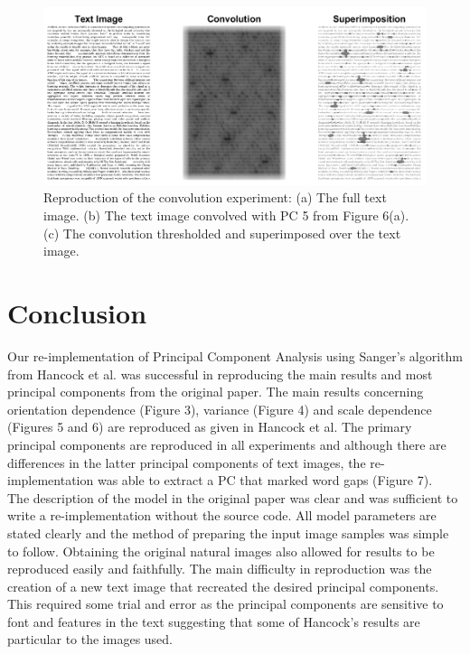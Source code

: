\begin{figure}
    \centering
    \includegraphics[scale=0.55]{figures/Figure7.png}
    \caption{Reproduction of the convolution experiment: (a) The full text image. (b) The text image convolved with PC 5 from Figure 6(a). (c) The convolution thresholded and superimposed over the text image.}
    \label{fig:Figure7}
\end{figure}

\section{Conclusion}
Our re-implementation of Principal Component Analysis using Sanger's algorithm from Hancock et al. was successful in reproducing the main results and most principal components from the original paper. The main results concerning orientation dependence (Figure 3), variance (Figure 4) and scale dependence (Figures 5 and 6) are reproduced as given in Hancock et al. The primary principal components are reproduced in all experiments and although there are differences in the latter principal components of text images, the re-implementation was able to extract a PC that marked word gaps (Figure 7).\\
The description of the model in the original paper was clear and was sufficient to write a re-implementation without the source code. All model parameters are stated clearly and the method of preparing the input image samples was simple to follow. Obtaining the original natural images also allowed for results to be reproduced easily and faithfully. The main difficulty in reproduction was the creation of a new text image that recreated the desired principal components. This required some trial and error as the principal components are sensitive to font and features in the text suggesting that some of Hancock's results are particular to the images used.
